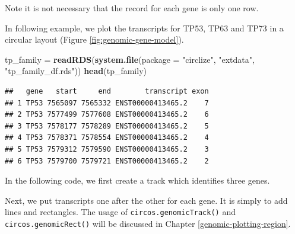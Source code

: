 \documentclass[]{book}
\newenvironment{Shaded}{\begin{snugshade}}{\end{snugshade}}
\newcommand{\KeywordTok}[1]{\textcolor[rgb]{0.13,0.29,0.53}{\textbf{#1}}}
\newcommand{\DataTypeTok}[1]{\textcolor[rgb]{0.13,0.29,0.53}{#1}}
\newcommand{\DecValTok}[1]{\textcolor[rgb]{0.00,0.00,0.81}{#1}}
\newcommand{\FloatTok}[1]{\textcolor[rgb]{0.00,0.00,0.81}{#1}}
\newcommand{\StringTok}[1]{\textcolor[rgb]{0.31,0.60,0.02}{#1}}
\newcommand{\OtherTok}[1]{\textcolor[rgb]{0.56,0.35,0.01}{#1}}
\newcommand{\NormalTok}[1]{#1}
\theoremstyle{definition}
\theoremstyle{definition}
\theoremstyle{remark}
\begin{document}
Note it is not necessary that the record for each gene is only one row.

In following example, we plot the transcripts for TP53, TP63 and TP73 in
a circular layout (Figure \ref{fig:genomic-gene-model}).

\begin{Shaded}
\begin{Highlighting}[]
\NormalTok{tp_family =}\StringTok{ }\KeywordTok{readRDS}\NormalTok{(}\KeywordTok{system.file}\NormalTok{(}\DataTypeTok{package =} \StringTok{"circlize"}\NormalTok{, }\StringTok{"extdata"}\NormalTok{, }\StringTok{"tp_family_df.rds"}\NormalTok{))}
\KeywordTok{head}\NormalTok{(tp_family)}
\end{Highlighting}
\end{Shaded}

\begin{verbatim}
##   gene   start     end        transcript exon
## 1 TP53 7565097 7565332 ENST00000413465.2    7
## 2 TP53 7577499 7577608 ENST00000413465.2    6
## 3 TP53 7578177 7578289 ENST00000413465.2    5
## 4 TP53 7578371 7578554 ENST00000413465.2    4
## 5 TP53 7579312 7579590 ENST00000413465.2    3
## 6 TP53 7579700 7579721 ENST00000413465.2    2
\end{verbatim}

In the following code, we first create a track which identifies three
genes.

\begin{Shaded}
\end{Shaded}

Next, we put transcripts one after the other for each gene. It is simply
to add lines and rectangles. The usage of \texttt{circos.genomicTrack()}
and \texttt{circos.genomicRect()} will be discussed in Chapter
\ref{genomic-plotting-region}.
\end{document}
